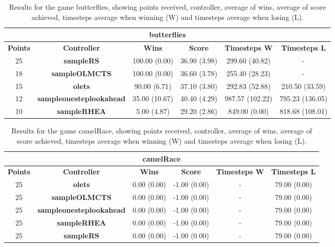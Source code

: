 \begin{table*}[!t]
\begin{center}
\begin{tabular}{|c|c|c|c|c|c|}
\multicolumn{6}{c}{\textbf{butterflies}}\\
\hline
\textbf{Points} & \textbf{Controller} & \textbf{Wins} &  \textbf{Score} & \textbf{Timesteps W} & \textbf{Timesteps L}\\
\hline
25 & \textbf{sampleRS} & 100.00 (0.00) & 36.90 (3.98) & 299.60 (40.82) &  - 
 \\
\hline
18 & \textbf{sampleOLMCTS} & 100.00 (0.00) & 36.60 (3.78) & 255.40 (28.23) &  - 
 \\
\hline
15 & \textbf{olets} & 90.00 (6.71) & 37.10 (3.80) & 292.83 (52.88) & 210.50 (33.59)
 \\
\hline
12 & \textbf{sampleonesteplookahead} & 35.00 (10.67) & 40.40 (4.29) & 987.57 (102.22) & 795.23 (136.05)
 \\
\hline
10 & \textbf{sampleRHEA} & 5.00 (4.87) & 29.20 (2.86) & 849.00 (0.00) & 818.68 (108.01)
 \\
\hline
\end{tabular}
\caption{Results for the game butterflies, showing points received, controller, average of wins, average of score achieved, timesteps average when winning (W) and timesteps average when losing (L).}
\label{tab:weights}
\end{center}
\end{table*}
\begin{table*}[!t]
\begin{center}
\begin{tabular}{|c|c|c|c|c|c|}
\multicolumn{6}{c}{\textbf{camelRace}}\\
\hline
\textbf{Points} & \textbf{Controller} & \textbf{Wins} &  \textbf{Score} & \textbf{Timesteps W} & \textbf{Timesteps L}\\
\hline
25 & \textbf{olets} & 0.00 (0.00) & -1.00 (0.00) &  -  & 79.00 (0.00)
 \\
\hline
25 & \textbf{sampleOLMCTS} & 0.00 (0.00) & -1.00 (0.00) &  -  & 79.00 (0.00)
 \\
\hline
25 & \textbf{sampleonesteplookahead} & 0.00 (0.00) & -1.00 (0.00) &  -  & 79.00 (0.00)
 \\
\hline
25 & \textbf{sampleRHEA} & 0.00 (0.00) & -1.00 (0.00) &  -  & 79.00 (0.00)
 \\
\hline
25 & \textbf{sampleRS} & 0.00 (0.00) & -1.00 (0.00) &  -  & 79.00 (0.00)
 \\
\hline
\end{tabular}
\caption{Results for the game camelRace, showing points received, controller, average of wins, average of score achieved, timesteps average when winning (W) and timesteps average when losing (L).}
\label{tab:weights}
\end{center}
\end{table*}
